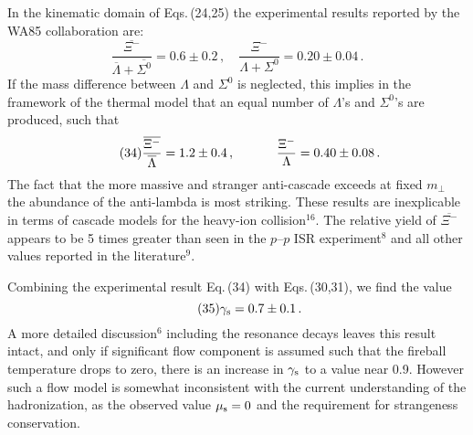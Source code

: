 \begin{mdframed}[linecolor=gray,roundcorner=12pt,backgroundcolor=Dandelion!15,linewidth=1pt,leftmargin=0cm,rightmargin=0cm,topline=true,bottomline=true,skipabove=12pt]
In the kinematic domain of Eqs.\,(24,25) the
experimental results reported by the WA85 collaboration are:
\begin{equation}
\tag{33} \frac{\overline{\Xi^-}}{\overline{\Lambda}+\overline{\Sigma^0}}
 = 0.6 \pm 0.2\, , \quad
 \frac{\Xi^-}{\Lambda+\Sigma^0} = 0.20 \pm 0.04\, .
\end{equation}
If the mass difference between $\Lambda$ and $\Sigma^0$ is neglected,
this implies in the framework of the thermal model that an equal number
of $\Lambda$'s and $\Sigma^0$'s are produced, such that
\begin{equation}
\tag{34} \frac{\overline{\Xi^-}}{\overline \Lambda}
 = 1.2 \pm 0.4\, , \hspace{1.15cm} 
 \frac{\Xi^-}{\Lambda} = 0.40 \pm 0.08\, .
\end{equation}
The fact that the more massive and stranger anti-cascade exceeds at fixed
$m_\bot$ the abundance of the anti-lambda is most striking. These
results are inexplicable in terms of cascade models for the heavy-ion
collision$^{16}$. The relative yield of $\overline{\Xi^-}$ appears to be
5 times greater than seen in the $p$--$p$ ISR experiment$^{8}$ and all
other values reported in the literature$^9$.
 
Combining the experimental result Eq.\,(34) with 
Eqs.\,(30,31), we find the value
\begin{equation}
\tag{35} \gamma_{\rm s}=0.7 \pm 0.1\, .
\end{equation} 
A more detailed discussion$^6$ including the resonance decays leaves
this result intact, and only if significant flow component is assumed
such that the fireball temperature drops to zero, there is an increase in
$\gamma_{\rm s}$ to a value near 0.9. However such a flow model is
somewhat inconsistent with the current understanding of the
hadronization, as the observed value $\mu_{\rm s}=0$ and the requirement
for strangeness conservation.


\end{mdframed}
